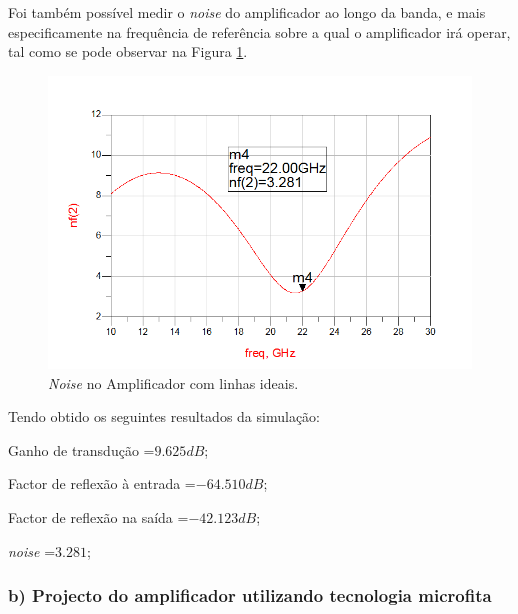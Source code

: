 \documentclass[11pt]{article}
\numberwithin{equation}{section}
\begin{document}
Foi também possível medir o \textit{noise} do amplificador ao longo da banda, e mais especificamente na frequência de referência sobre a qual o amplificador irá operar, tal como se pode observar na Figura \ref{fig:ideal_noise}.

\begin{figure}[H]
	\centering
	\includegraphics[keepaspectratio=true, scale=0.45]{exps/Ideal_noise}
	\vspace{-0.5em}
	\caption{\textit{Noise} no Amplificador com linhas ideais.}
	\vspace{-0.8em}
	\label{fig:ideal_noise}
\end{figure}



Tendo obtido os seguintes resultados da simulação:
\begin{list}{-}{}
	\item Ganho de transdução =$ 9.625 dB $;
	\item Factor de reflexão à entrada =$ -64.510 dB $;
	\item Factor de reflexão na saída =$ -42.123 dB $;
	\item \textit{noise} =$ 3.281 $;
\end{list}



\subsubsection{b) Projecto do amplificador utilizando tecnologia microfita}
\end{document}

